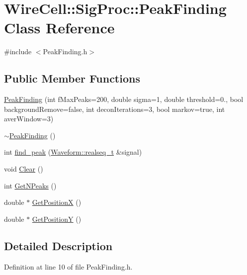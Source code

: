 \hypertarget{class_wire_cell_1_1_sig_proc_1_1_peak_finding}{}\section{Wire\+Cell\+:\+:Sig\+Proc\+:\+:Peak\+Finding Class Reference}
\label{class_wire_cell_1_1_sig_proc_1_1_peak_finding}


{\ttfamily \#include $<$Peak\+Finding.\+h$>$}

\subsection*{Public Member Functions}
\begin{DoxyCompactItemize}
\item 
\hyperlink{class_wire_cell_1_1_sig_proc_1_1_peak_finding_a422708530e34ee207959d873860f9aaf}{Peak\+Finding} (int f\+Max\+Peaks=200, double sigma=1, double threshold=0., bool background\+Remove=false, int decon\+Iterations=3, bool markov=true, int aver\+Window=3)
\item 
\hyperlink{class_wire_cell_1_1_sig_proc_1_1_peak_finding_abc705320887d205ed48a5aa3d3022245}{$\sim$\+Peak\+Finding} ()
\item 
int \hyperlink{class_wire_cell_1_1_sig_proc_1_1_peak_finding_aa66a533f1d774c2c73c9d07744a3d6d1}{find\+\_\+peak} (\hyperlink{namespace_wire_cell_1_1_waveform_a479175e541c8545e87cd8063b74b6956}{Waveform\+::realseq\+\_\+t} \&signal)
\item 
void \hyperlink{class_wire_cell_1_1_sig_proc_1_1_peak_finding_ab4d567863883d75efc434f8193cd4b6a}{Clear} ()
\item 
int \hyperlink{class_wire_cell_1_1_sig_proc_1_1_peak_finding_a7266f6b9a28655301cb4b802eb02af76}{Get\+N\+Peaks} ()
\item 
double $\ast$ \hyperlink{class_wire_cell_1_1_sig_proc_1_1_peak_finding_a05680c66cae65c8d54244f19aaa3ba4a}{Get\+PositionX} ()
\item 
double $\ast$ \hyperlink{class_wire_cell_1_1_sig_proc_1_1_peak_finding_ab148b0ccbdadeb7e418cb0f11b0dc3cd}{Get\+PositionY} ()
\end{DoxyCompactItemize}


\subsection{Detailed Description}


Definition at line 10 of file Peak\+Finding.\+h.



